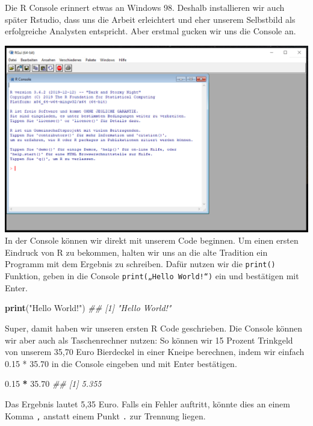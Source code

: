 \documentclass[
]{book}
\newenvironment{Shaded}{\begin{snugshade}}{\end{snugshade}}
\newcommand{\CommentTok}[1]{\textcolor[rgb]{0.56,0.35,0.01}{\textit{#1}}}
\newcommand{\FloatTok}[1]{\textcolor[rgb]{0.00,0.00,0.81}{#1}}
\newcommand{\KeywordTok}[1]{\textcolor[rgb]{0.13,0.29,0.53}{\textbf{#1}}}
\newcommand{\NormalTok}[1]{#1}
\newcommand{\OperatorTok}[1]{\textcolor[rgb]{0.81,0.36,0.00}{\textbf{#1}}}
\newcommand{\StringTok}[1]{\textcolor[rgb]{0.31,0.60,0.02}{#1}}
\begin{document}
Die R Console erinnert etwas an Windows 98. Deshalb installieren wir auch später Rstudio, dass uns die Arbeit erleichtert und eher unserem Selbstbild als erfolgreiche Analysten entspricht. Aber erstmal gucken wir uns die Console an.

\includegraphics[width=21.25in]{img/s_r-console}
In der Console können wir direkt mit unserem Code beginnen. Um einen ersten Eindruck von R zu bekommen, halten wir uns an die alte Tradition ein Programm mit dem Ergebnis zu schreiben. Dafür nutzen wir die \texttt{print()} Funktion, geben in die Console \texttt{print(„Hello\ World!“)} ein und bestätigen mit Enter.

\begin{Shaded}
\begin{Highlighting}[]
\KeywordTok{print}\NormalTok{(}\StringTok{"Hello World!"}\NormalTok{)}
\CommentTok{## [1] "Hello World!"}
\end{Highlighting}
\end{Shaded}

Super, damit haben wir unseren ersten R Code geschrieben.
Die Console können wir aber auch als Taschenrechner nutzen: So können wir 15 Prozent Trinkgeld von unserem 35,70 Euro Bierdeckel in einer Kneipe berechnen, indem wir einfach 0.15 * 35.70 in die Console eingeben und mit Enter bestätigen.

\begin{Shaded}
\begin{Highlighting}[]
\FloatTok{0.15} \OperatorTok{*}\StringTok{ }\FloatTok{35.70}
\CommentTok{## [1] 5.355}
\end{Highlighting}
\end{Shaded}

Das Ergebnis lautet 5,35 Euro. Falls ein Fehler auftritt, könnte dies an einem Komma \texttt{,} anstatt einem Punkt \texttt{.} zur Trennung liegen.
\end{document}
